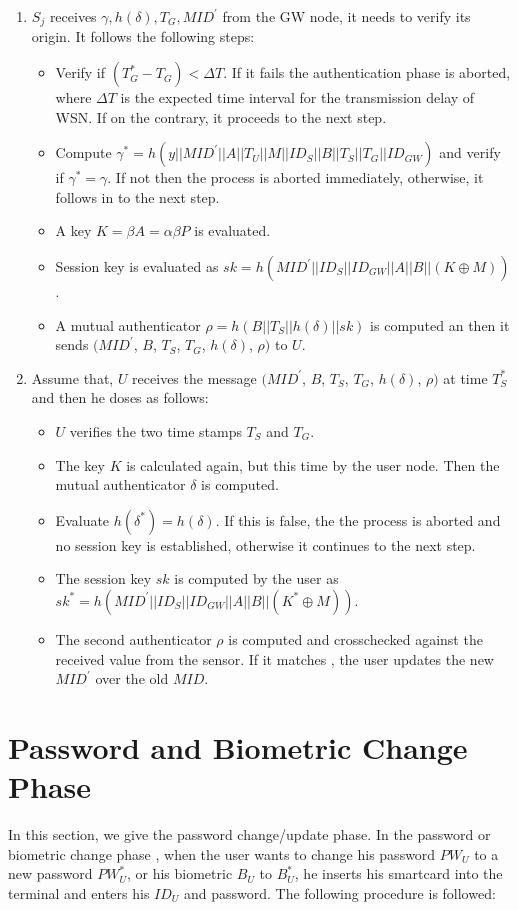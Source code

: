 \documentclass[a4paper,12pt]{report}
\begin{document}
\begin{enumerate}
\item $S_{j}$ receives ${\gamma, h(\delta), T_G, MID^{\prime}}$ from the GW node, it
needs to verify its origin. It follows the following steps:
\begin{itemize}
 \item Verify if $(T_{G}^{*}-T_{G})<\Delta T$. If it fails the authentication phase is aborted, where $\Delta T$ is the expected time interval for the transmission delay of WSN. If on the contrary, it proceeds to the next step.
 \item Compute  $\gamma^{*} = h(y||MID^{\prime}||A||T_U||M||ID_S||B||T_S||T_G||ID_{GW})$ and verify if  $\gamma ^*= \gamma$. If not then the process is aborted immediately, otherwise, it follows in to the next step.
 \item A key  $K =  \beta A = \alpha \beta P $ is evaluated.
 \item Session key is evaluated as $sk = h(MID^{\prime}||ID_S||ID_{GW}||A||B||(K\oplus M))$.
 \item A mutual authenticator $\rho = h(B ||T_S||h( \delta)||sk)$ is computed an then  it sends $(MID^{\prime}$, $B$, $T_S$, $T_G$, $h(\delta)$, $\rho)$ to $U$.
\end{itemize}

 \item Assume that, $U$ receives the message $(MID^{\prime}$, $B$, $T_S$, $T_G$, $h(\delta)$, $\rho)$ at time $T_{S}^{*}$ and then he doses as follows:
\begin{itemize}
 \item $U$ verifies the two time stamps $T_S$ and $T_G$.
 \item The key $K$ is calculated again, but this time by the user node. Then the mutual authenticator $ \delta $ is computed.
 \item Evaluate $h(\delta ^*) = h(\delta)$. If this is false, the the process is aborted and no session key is established, otherwise it continues to the next step.
 \item The session key $sk$ is computed by the user as $sk^* = h(MID^{\prime}||ID_S||ID_{GW}||A||B||(K^* \oplus M))$.
 \item The second authenticator $\rho$ is computed and crosschecked against the received value from the sensor. If it matches , the user updates the new $MID^{\prime}$ over the old $MID$.
\end{itemize}

\end{enumerate}


\section{Password and Biometric Change Phase}
In this section, we give the password change/update phase. In the
password or biometric change phase , when the user wants to change
his password $PW_U$ to a new password $PW_{U}^{*}$, or his biometric
$B_U$ to $B_{U}^*$, he inserts his smartcard into the terminal and
enters his $ID_U$ and password. The following procedure is followed:
\end{document}
